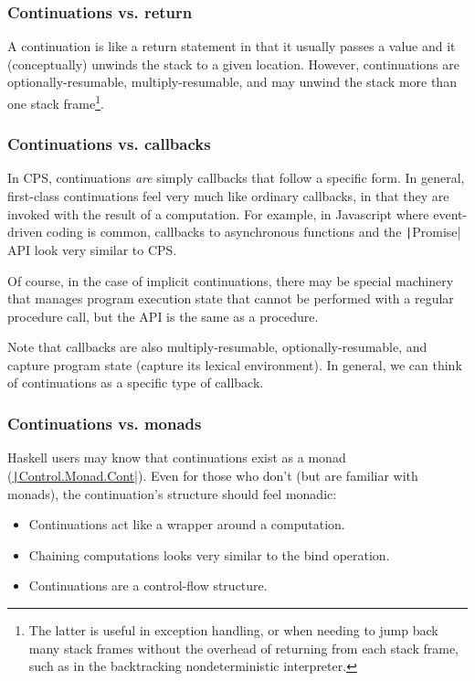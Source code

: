 \documentclass[]{article}
\begin{document}
\subsubsection{Continuations vs. return}
\label{sec:retu}

A continuation is like a return statement in that it usually passes a value and it (conceptually) unwinds the stack to a given location. However, continuations are optionally-resumable, multiply-resumable, and may unwind the stack more than one stack frame\footnote{The latter is useful in exception handling, or when needing to jump back many stack frames without the overhead of returning from each stack frame, such as in the backtracking nondeterministic interpreter.}.

\subsubsection{Continuations vs. callbacks}
\label{sec:call}

In CPS, continuations \textit{are} simply callbacks that follow a specific form. In general, first-class continuations feel very much like ordinary callbacks, in that they are invoked with the result of a computation. For example, in Javascript where event-driven coding is common, callbacks to asynchronous functions and the \texttt|Promise| API look very similar to CPS.

Of course, in the case of implicit continuations, there may be special machinery that manages program execution state that cannot be performed with a regular procedure call, but the API is the same as a procedure.

Note that callbacks are also multiply-resumable, optionally-resumable, and capture program state (capture its lexical environment). In general, we can think of continuations as a specific type of callback.

\subsubsection{Continuations vs. monads}
\label{sec:mona}

Haskell users may know that continuations exist as a monad (\href{https://hackage.haskell.org/package/mtl-2.2.2/docs/Control-Monad-Cont.html}{\texttt|Control.Monad.Cont|}). Even for those who don't (but are familiar with monads), the continuation's structure should feel monadic:
\begin{itemize}
\item Continuations act like a wrapper around a computation.
\item Chaining computations looks very similar to the bind operation.
\item Continuations are a control-flow structure.
\end{itemize}
\end{document}
